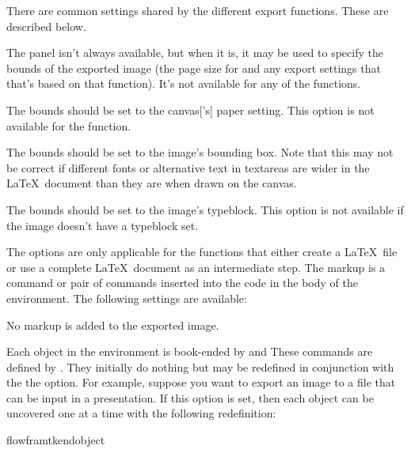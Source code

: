 There are common settings shared by the different export functions.
These are described below.


The  panel isn't always available, but when it
is, it may be used to specify the bounds of the exported image (the
page size for  and any export settings that
that's based on that function).
It's not available for any of the 
functions.


The bounds should be set to the \gls{canvas}['s] paper setting. This
option is not available for the  function.


The bounds should be set to the image's bounding box.
Note that this may not be correct if different fonts or alternative
text in \glspl{textarea} are wider in the \LaTeX\ document than they
are when drawn on the \gls{canvas}.


The bounds should be set to the image's \gls{typeblock}.
This option is not available if the image doesn't have a
\gls{typeblock} set.


The  options are only applicable for the
 functions that either create a
\LaTeX\ file or use a complete \LaTeX\ document as an intermediate
step. The markup is a command or pair of commands inserted into
the code in the body of the  environment.
The following settings are available:


No markup is added to the exported image.


Each object in the  environment is book-ended by
and
These commands are defined by . They initially
do nothing but may be redefined in conjunction with the
the  option.
For example, suppose you want to export an image to a file that can
be input in a  presentation. If this option is set, then each object can be
uncovered one at a time with the following redefinition:
\begin{codebox}
\gls{flowframtkendobject}
\end{codebox}

